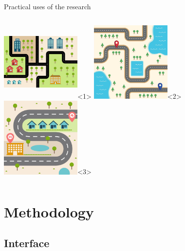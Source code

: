 \documentclass[english, aspectratio=169]{beamer}
\makeatletter
\let\origtableofcontents=\tableofcontents
\def\tableofcontents{\@ifnextchar[{\origtableofcontents}{\gobbletableofcontents}}
\def\gobbletableofcontents#1{\origtableofcontents}
\makeatother
\begin{document}
\begin{frame}{Practical uses of the research}
\begin{columns}
\begin{column}{0.3\textwidth}
	\includegraphics[scale=0.1, width=4cm, height=4cm]{images/within-city.jpg}<1>
	\includegraphics[scale=0.1, width=4cm, height=4cm]{images/green-field.jpg}<2>
	\includegraphics[scale=0.1, width=4cm, height=4cm]{images/mixed.jpg}<3>
\end{column}

\end{columns}
\end{frame}


\section{Methodology}

\begin{frame}
	\tableofcontents[currentsection]
\end{frame}

\subsection{Interface}
\end{document}
